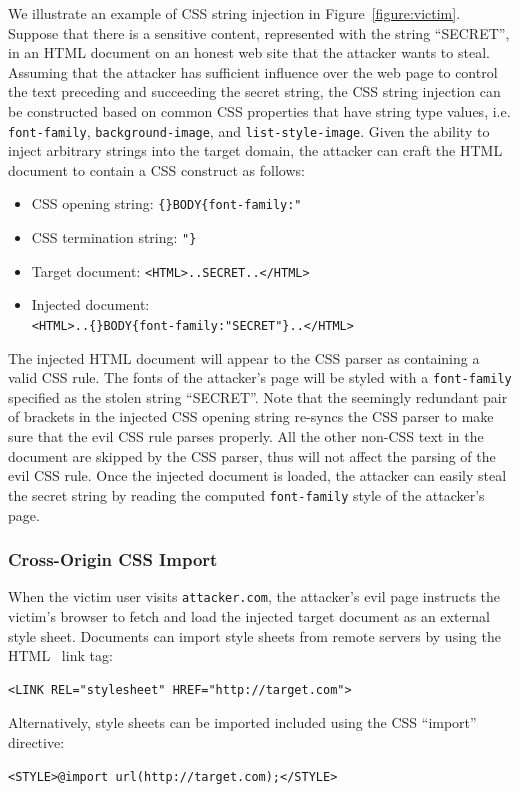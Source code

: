 \documentclass{acm_proc_article-sp}
\begin{document}
We illustrate an example of CSS string injection in Figure~\ref{figure:victim}. Suppose that there is a sensitive content, represented with the string ``SECRET'', in an HTML document on an honest web site that the attacker wants to steal. Assuming that the attacker has sufficient influence over the web page to control the text preceding and succeeding the secret string, the CSS string injection can be constructed based on common CSS properties that have string type values, i.e. \texttt{font-family}, \texttt{background-image}, and \texttt{list-style-image}. Given the ability to inject arbitrary strings into the target domain, the attacker can craft the HTML document to contain a CSS construct as follows:
\begin{itemize}
\item CSS opening string: \verb|{}BODY{font-family:"|
\item CSS termination string: \verb|"}|
\item Target document: \verb|<HTML>..SECRET..</HTML>|
\item Injected document: \\
\verb|<HTML>..{}BODY{font-family:"SECRET"}..</HTML>|
\end{itemize}
The injected HTML document will appear to the CSS parser as containing a valid CSS rule. The fonts of the attacker's page will be styled with a \texttt{font-family} specified as the stolen string ``SECRET''. Note that the seemingly redundant pair of brackets in the injected CSS opening string re-syncs the CSS parser to make sure that the evil CSS rule parses properly. All the other non-CSS text in the document are skipped by the CSS parser, thus will not affect the parsing of the evil CSS rule. Once the injected document is loaded, the attacker can easily steal the secret string by reading the computed \texttt{font-family} style of the attacker's page.

\subsubsection{Cross-Origin CSS Import}
When the victim user visits \texttt{attacker.com}, the attacker's evil page instructs the victim's browser to fetch and load the injected target document as an external style sheet. Documents can import style sheets from remote servers by using the HTML~\cite{html} link tag:
\begin{verbatim}
<LINK REL="stylesheet" HREF="http://target.com">
\end{verbatim}
Alternatively, style sheets can be imported included using the CSS ``import'' directive:
\begin{verbatim}
<STYLE>@import url(http://target.com);</STYLE>
\end{verbatim}
\end{document}
